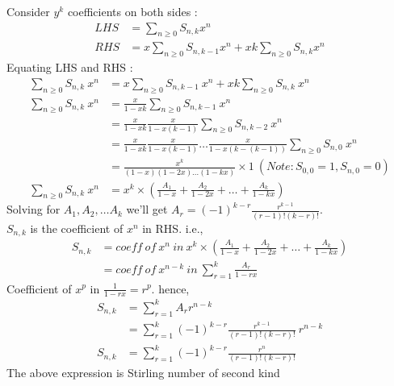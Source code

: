 Consider $y^k$ coefficients on both sides : 
\begin{equation}
  \begin{split}
    LHS &= \sum_{n \geq 0} S_{n, k} x^n \\
    RHS &= x\sum_{n \geq 0} S_{n, k-1} x^n + xk \sum_{n \geq 0} S_{n, k}x^n
\end{split}  
\end{equation}
Equating LHS and RHS :
\begin{align*}
\sum_{n \geq 0} S_{n, k}~ x^n &= x\sum_{n \geq 0} S_{n, k-1} ~x^n + xk \sum_{n \geq 0} S_{n, k}~x^n \\
\sum_{n \geq 0} S_{n, k} ~x^n &= \frac{x}{1-xk}  \sum_{n \geq 0} S_{n, k-1}~ x^n   \\
&= \frac{x}{1-xk} \frac{x}{1-x(k-1)} \sum_{n \geq 0} S_{n, k-2}~ x^n \\
&= \frac{x}{1-xk} \frac{x}{1-x(k-1)} \dots \frac{x}{1-x(k-(k-1))}
\sum_{n \geq 0} S_{n, 0}~ x^n \\
&= \frac{x^k}{(1-x)(1-2x)\dots (1-kx)} \times 1 ~( Note : S_{0,0} = 1, S_{n, 0} = 0) \\
\sum_{n \geq 0} S_{n, k}~ x^n &= x^k \times (\frac{A_1}{1-x} + \frac{A_2}{1-2x} + \dots +  \frac{A_k}{1-kx})
\end{align*}
Solving for $A_1, A_2, \dots A_k $ we'll get $A_r = (-1)^{k-r} \frac{r^{k-1}}{(r-1)! (k-r)!}$. \\
$S_{n,k}$ is the coefficient of $x^n$ in RHS. i.e., 
\begin{align*}
S_{n,k} &= coeff~ of ~x^n ~in~ x^k \times (\frac{A_1}{1-x} + \frac{A_2}{1-2x} + \dots +  \frac{A_k}{1-kx}) \\
&= coeff ~ of ~ x^{n-k} ~ in ~ \sum_{r=1}^k \frac{A_r}{1-rx}
\end{align*}
Coefficient of $x^{p}$ in $\frac{1}{1-rx} = r^p$. hence,
\begin{align*}
S_{n,k} &= \sum_{r=1}^k A_r r^{n-k} \\
&= \sum_{r=1}^k (-1)^{k-r} \frac{r^{k-1}}{(r-1)! (k-r)!} ~ r^{n-k}\\
S_{n,k} &= \sum_{r=1}^k (-1)^{k-r} \frac{r^{n}}{(r-1)! (k-r)!}
\end{align*}
The above expression is Stirling number of second kind

